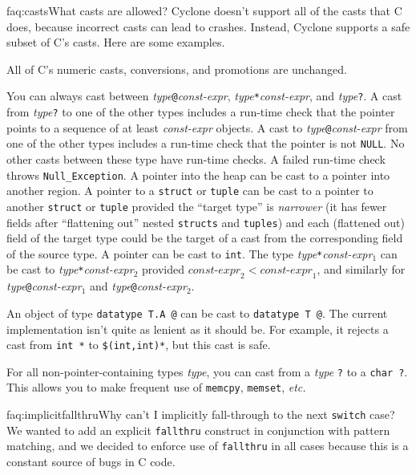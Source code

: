 \begin{faqa}{faq:casts}{What casts are allowed?}
Cyclone doesn't support all of the casts that C does, because
incorrect casts can lead to crashes.  Instead, Cyclone supports a safe
subset of C's casts.  Here are some examples.

All of C's numeric casts, conversions, and promotions are unchanged.

You can always cast between
\textit{type}\texttt{@}\lb\textit{const-expr}\rb,
\textit{type}\texttt{*}\lb\textit{const-expr}\rb, and
\textit{type}\texttt{?}.
A cast from 
\textit{type}\texttt{?}
to one of the other types includes a run-time check that the pointer
points to a sequence of at least \textit{const-expr} objects.
A cast to
\textit{type}\texttt{@}\lb\textit{const-expr}\rb
from one of the
other types includes a run-time check that the pointer is not
\texttt{NULL}.
No other casts between these type have run-time checks.
A failed run-time check throws \texttt{Null_Exception}.
A pointer into the heap can be cast to a pointer into another region.
A pointer to a \texttt{struct} or \texttt{tuple} can be
cast to a pointer to another \texttt{struct} or \texttt{tuple}
provided the ``target type'' 
is \emph{narrower} (it has fewer fields after ``flattening out'' nested
\texttt{structs} and \texttt{tuples}) and each (flattened out) field
of the target type could be the target of a cast from the
corresponding field of the source type.
A pointer can be cast to \texttt{int}.
The type
\textit{type}\texttt{*}\lb\textit{const-expr}$_1$\rb
can be cast to
\textit{type}\texttt{*}\lb\textit{const-expr}$_2$\rb
provided
$\textit{const-expr}_2 < \textit{const-expr}_1$, and similarly for
\textit{type}\texttt{@}\lb\textit{const-expr}$_1$\rb
and
\textit{type}\texttt{@}\lb\textit{const-expr}$_2$\rb.

An object of type \texttt{datatype T.A @} can be cast to
\texttt{datatype T @}.  The current implementation isn't quite as
lenient as it should be.  For example, it rejects a cast from
\texttt{int *\rb} to \texttt{\$(int,int)*\rb}, but this cast
is safe.

For all non-pointer-containing types \textit{type}, you can cast from a
\textit{type} \texttt{?} to a \texttt{char ?}.  This allows you to make
frequent use of \texttt{memcpy}, \texttt{memset}, \emph{etc.}
\end{faqa}

\begin{faqa}{faq:implicitfallthru}{Why can't I implicitly fall-through to the next \texttt{switch} case?}
We wanted to add an explicit \texttt{fallthru} construct in
conjunction with pattern matching, and we decided to enforce use of
\texttt{fallthru} in all cases because this is a constant source of
bugs in C code.
\end{faqa}

